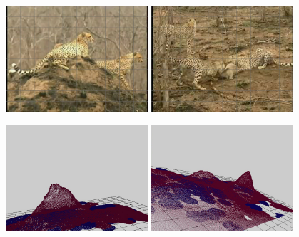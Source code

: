 \begin{figure}
\centering


\includegraphics[width=0.47\textwidth,bb=0 0 640 480]{PER1.jpg}
\includegraphics[width=0.47\textwidth,bb=0 0 640 480]{PER2.jpg}

\includegraphics[width=0.47\textwidth,bb=0 0 640 480]{1.jpg}
\includegraphics[width=0.47\textwidth,bb=0 0 640 480]{3.jpg}


\end{figure}

